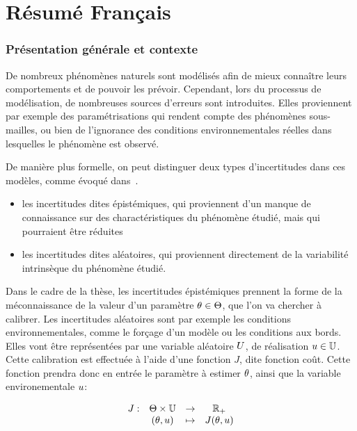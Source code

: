 \documentclass[../../Main_ManuscritThese.tex]{subfiles}
\begin{document}
\chapter*{Résumé Français}
\TitleBtwLines

{}
\label{chap:resume_fr}
\pagestyle{resumeStyle}

\subsection*{Présentation générale et contexte}
De nombreux phénomènes naturels sont modélisés afin de mieux connaître leurs comportements et de pouvoir les prévoir.
Cependant, lors du processus de modélisation, de nombreuses sources d'erreurs sont introduites. Elles proviennent par exemple des paramétrisations qui rendent compte des phénomènes sous-mailles, ou bien de l'ignorance des conditions environnementales réelles dans lesquelles le phénomène est observé.

De manière plus formelle, on peut distinguer deux types d'incertitudes dans ces modèles, comme évoqué dans~\cite{walker_defining_2003}.
\begin{itemize}
\item les incertitudes dites épistémiques, qui proviennent d'un manque de connaissance sur des charactéristiques du phénomène étudié, mais qui pourraient être réduites 
\item les incertitudes dites aléatoires, qui proviennent directement de la variabilité intrinsèque du phénomène étudié.
\end{itemize}

Dans le cadre de la thèse, les incertitudes épistémiques prennent la forme de la méconnaissance de la valeur d'un paramètre $\theta \in \Theta$, que l'on va chercher à calibrer. Les incertitudes aléatoires sont par exemple les conditions environnementales, comme le forçage d'un modèle ou les conditions aux bords. Elles vont être représentées par une variable aléatoire $U$, de réalisation $u\in \mathbb{U}$.
Cette calibration est effectuée à l'aide d'une fonction $J$, dite fonction coût. Cette fonction prendra donc en entrée le paramètre à estimer $\theta$, ainsi que la variable environementale $u$:

\begin{equation}
  \label{eq:def_J}
  \begin{array}{rccc}
   J: & \Theta\times\mathbb{U}& \rightarrow& \mathbb{R}_+ \\
   &(\theta,u)& \mapsto& J(\theta,u)
  \end{array}
\end{equation}
\end{document}
